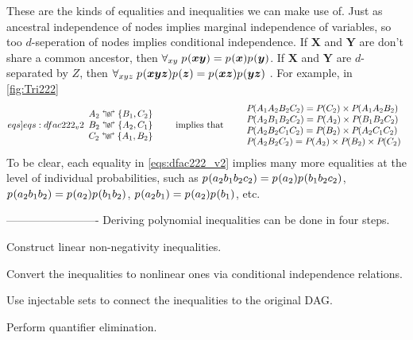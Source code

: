 {\begin{asparadesc}





These are the kinds of equalities and inequalities we can make use of. 
 Just as ancestral independence of nodes implies marginal independence of variables, so too $d$-seperation of nodes implies conditional independence. If $\bm{X}$ and $\bm{Y}$ are don't share a common ancestor, then ${\forall_{x y}\;{p_{}}\lparen\bm{x} \bm{y} \rparen={p_{}}\lparen\bm{x}\rparen{p_{}}\lparen\bm{y}\rparen}$. If $\bm{X}$ and $\bm{Y}$ are $d$-separated by $Z$, then ${\forall_{xy z}\;{p_{}}\lparen\bm{x} \bm{y} \bm{z}\rparen{p_{}}\lparen\bm{z}\rparen={p_{}}\lparen\bm{x}\bm{z}\rparen{p_{}}\lparen\bm{y}\bm{z}\rparen}$ \cite{pearl2009causality,spirtes2011causation,studeny2005probabilistic,koller2009probabilistic}. For example, in \cref{fig:Tri222}
\begin{align}\begin{split}\label[eqs]{eqs:dfac222_v2}
\larray{
A_2\aindep\{B_1,C_2\}\\
B_2\aindep\{A_2,C_1\}\\
C_2\aindep\{A_1,B_2\}
}\qquad\text{implies that}\qquad
\larray{
\pdf{A_1 A_2 B_2 C_2}=\pdf{C_2}\times\pdf{A_1 A_2 B_2}\\
\pdf{A_2 B_1 B_2 C_2}=\pdf{A_2}\times\pdf{B_1 B_2 C_2}\\
\pdf{A_2 B_2 C_1 C_2}=\pdf{B_2}\times\pdf{A_2 C_1 C_2}\\
\pdf{A_2 B_2 C_2}=\pdf{A_2}\times\pdf{B_2}\times\pdf{C_2}\\
}
\end{split}\end{align}
To be clear, each equality in \cref{eqs:dfac222_v2} implies many more equalities at the level of individual probabilities, such as ${{p_{}}\lparen a_2 b_1 b_2 c_2\rparen= {p_{}}\lparen a_2\rparen {p_{}}\lparen b_1 b_2 c_2\rparen}$, ${{p_{}}\lparen a_2 b_1 b_2\rparen= {p_{}}\lparen a_2\rparen {p_{}}\lparen b_1 b_2\rparen}$, ${{p_{}}\lparen a_2 b_1\rparen= {p_{}}\lparen a_2\rparen {p_{}}\lparen b_1\rparen}$, etc. 



\end{asparadesc}


-------------------------
Deriving polynomial inequalities can be done in four steps. 
\begin{compactenum}
\item Construct linear non-negativity inequalities.
\item Convert the inequalities to nonlinear ones via conditional independence relations.
\item Use injectable sets to connect the inequalities to the original DAG.
\item Perform quantifier elimination.
\end{compactenum}

}
